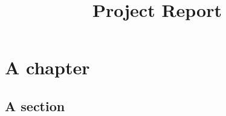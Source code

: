 \documentclass[10pt]{book}
\begin{document}
\title{Project Report}

\chapter{A chapter}

\section{A section}
\end{document}
